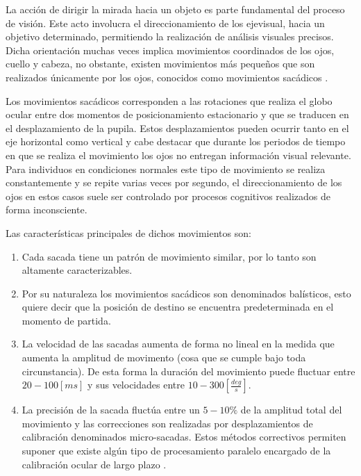 \documentclass[../main.tex]{subfiles}
\begin{document}
		La acción de dirigir la mirada hacia un objeto es parte fundamental del proceso de visión. Este acto involucra el direccionamiento de los \gls{ejevisual}, hacia un objetivo determinado, permitiendo la realización de análisis visuales precisos. Dicha orientación muchas veces implica movimientos coordinados de los ojos, cuello y cabeza, no obstante, existen movimientos más pequeños que son realizados únicamente por los ojos, conocidos como movimientos sacádicos \cite{article:movOcular, website:movOcular}.

		Los movimientos sacádicos corresponden a las rotaciones que realiza el globo ocular entre dos momentos de posicionamiento estacionario y que se traducen en el desplazamiento de la pupila. Estos desplazamientos pueden ocurrir tanto en el eje horizontal como vertical y cabe destacar que durante los periodos de tiempo en que se realiza el movimiento los ojos no entregan información visual relevante. Para individuos en condiciones normales este tipo de movimiento se realiza constantemente y se repite varias veces por segundo, el direccionamiento de los ojos en estos casos suele ser controlado por procesos cognitivos realizados de forma inconsciente.

		Las características principales de dichos movimientos son:
		\begin{enumerate}
			\item Cada sacada tiene un patrón de movimiento similar, por lo tanto son altamente caracterizables.

			\item Por su naturaleza los movimientos sacádicos son denominados balísticos, esto quiere decir que la posición de destino se encuentra predeterminada en el momento de partida. 

			\item La velocidad de las sacadas aumenta de forma no lineal en la medida que aumenta la amplitud de movimento (cosa que se cumple bajo toda circunstancia). De esta forma la duración del movimiento puede fluctuar entre $20 - 100[ms]$ y sus velocidades entre $10 - 300 [\frac{deg}{s}]$.

			\item La precisión de la sacada fluctúa entre un $5-10\%$ de la amplitud total del movimiento y las correcciones son realizadas por desplazamientos de calibración denominados micro-sacadas. Estos métodos correctivos permiten suponer que existe algún tipo de procesamiento paralelo encargado de la calibración ocular de largo plazo \cite{website:movOcular}.  

		\end{enumerate}
\end{document}
